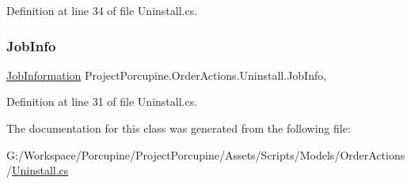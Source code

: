 Definition at line 34 of file Uninstall.\+cs.

\mbox{\label{class_project_porcupine_1_1_order_actions_1_1_uninstall_a7ae6e09e05eda545d09f31a89264ab56}} 
\subsubsection{\texorpdfstring{Job\+Info}{JobInfo}}
{\footnotesize\ttfamily \hyperlink{class_project_porcupine_1_1_order_actions_1_1_order_action_1_1_job_information}{Job\+Information} Project\+Porcupine.\+Order\+Actions.\+Uninstall.\+Job\+Info\hspace{0.3cm}{\ttfamily [get]}, {\ttfamily [set]}}



Definition at line 31 of file Uninstall.\+cs.



The documentation for this class was generated from the following file\+:\begin{DoxyCompactItemize}
\item 
G\+:/\+Workspace/\+Porcupine/\+Project\+Porcupine/\+Assets/\+Scripts/\+Models/\+Order\+Actions/\hyperlink{_uninstall_8cs}{Uninstall.\+cs}\end{DoxyCompactItemize}

